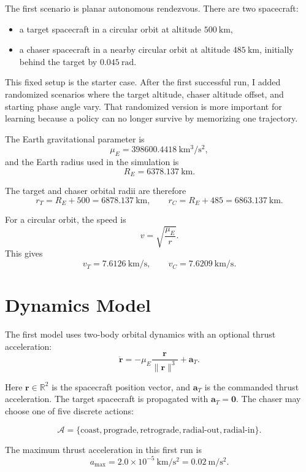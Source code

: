 \documentclass[11pt]{article}
\begin{document}
The first scenario is planar autonomous rendezvous.
There are two spacecraft:

\begin{itemize}
    \item a target spacecraft in a circular orbit at altitude \(500~\mathrm{km}\),
    \item a chaser spacecraft in a nearby circular orbit at altitude \(485~\mathrm{km}\), initially behind the target by \(0.045~\mathrm{rad}\).
\end{itemize}

This fixed setup is the starter case.
After the first successful run, I added randomized scenarios where the target altitude, chaser altitude offset, and starting phase angle vary.
That randomized version is more important for learning because a policy can no longer survive by memorizing one trajectory.

The Earth gravitational parameter is
\[
    \mu_E = 398600.4418~\mathrm{km^3/s^2},
\]
and the Earth radius used in the simulation is
\[
    R_E = 6378.137~\mathrm{km}.
\]

The target and chaser orbital radii are therefore
\[
    r_T = R_E + 500 = 6878.137~\mathrm{km},
    \qquad
    r_C = R_E + 485 = 6863.137~\mathrm{km}.
\]

For a circular orbit, the speed is
\[
    v = \sqrt{\frac{\mu_E}{r}}.
\]
This gives
\[
    v_T = 7.6126~\mathrm{km/s},
    \qquad
    v_C = 7.6209~\mathrm{km/s}.
\]

\section{Dynamics Model}

The first model uses two-body orbital dynamics with an optional thrust acceleration:
\[
    \ddot{\mathbf r}
    =
    -\mu_E \frac{\mathbf r}{\|\mathbf r\|^3}
    +
    \mathbf a_T.
\]

Here \(\mathbf r \in \mathbb R^2\) is the spacecraft position vector, and \(\mathbf a_T\) is the commanded thrust acceleration.
The target spacecraft is propagated with \(\mathbf a_T = \mathbf 0\).
The chaser may choose one of five discrete actions:

\[
    \mathcal A =
    \{\text{coast}, \text{prograde}, \text{retrograde}, \text{radial-out}, \text{radial-in}\}.
\]

The maximum thrust acceleration in this first run is
\[
    a_{\max} = 2.0 \times 10^{-5}~\mathrm{km/s^2}
    =
    0.02~\mathrm{m/s^2}.
\]
\end{document}
